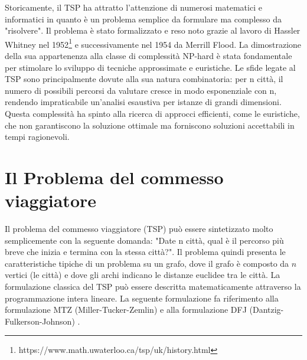 \documentclass[a4paper,12pt]{report}
\begin{document}
Storicamente, il TSP ha attratto l'attenzione di numerosi matematici e informatici in quanto è un problema semplice da formulare ma complesso da "risolvere". Il problema è stato formalizzato e reso noto grazie al lavoro di Hassler Whitney nel 1952\footnote[1]{https://www.math.uwaterloo.ca/tsp/uk/history.html} e successivamente nel 1954 da Merrill Flood. La dimostrazione della sua appartenenza alla classe di complessità NP-hard è stata fondamentale per stimolare lo sviluppo di tecniche approssimate e euristiche. Le sfide legate al TSP sono principalmente dovute alla sua natura combinatoria: per n città, il numero di possibili percorsi da valutare cresce in modo esponenziale con n, rendendo impraticabile un'analisi esaustiva per istanze di grandi dimensioni. Questa complessità ha spinto alla ricerca di approcci efficienti, come le euristiche, che non garantiscono la soluzione ottimale ma forniscono soluzioni accettabili in tempi ragionevoli.

\section{Il Problema del commesso viaggiatore}
Il problema del commesso viaggiatore (TSP) può essere sintetizzato molto semplicemente con la seguente domanda: "Date n città, qual è il percorso più breve che inizia e termina con la stessa città?". Il problema quindi presenta le caratteristiche tipiche di un problema su un grafo, dove il grafo è composto da $n$ vertici (le città) e dove gli archi indicano le distanze euclidee tra le città. La formulazione classica del TSP può essere descritta matematicamente attraverso la programmazione intera lineare. La seguente formulazione fa riferimento alla formulazione MTZ (Miller-Tucker-Zemlin) e alla formulazione DFJ (Dantzig-Fulkerson-Johnson) \cite{TSP formulation}.
\end{document}
